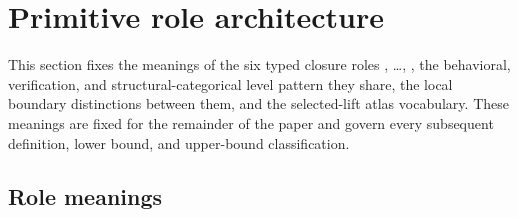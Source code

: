 \section{Primitive role architecture}\label{sec:primitive-role-architecture}

%
%
%
%

This section fixes the meanings of the six typed closure roles
\Pone{}, \ldots, \Psix{}, the behavioral, verification, and
structural-categorical level pattern they share, the local boundary
distinctions between them, and the selected-lift atlas vocabulary.
These meanings are fixed for the remainder of the paper and govern
every subsequent definition, lower bound, and upper-bound
classification.

\subsection{Role meanings}\label{subsec:role-meanings}

